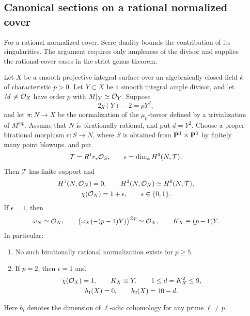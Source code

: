 \subsection{Canonical sections on a rational normalized cover}
\label{subsec:rational-canonical-equality}

For a rational normalized cover, Serre duality bounds the contribution
of its singularities. The argument requires only ampleness of the divisor
and supplies the rational-cover cases in the strict genus theorem.

\begin{proposition}\label{prop:rational-normalization-canonical}
Let $X$ be a smooth projective integral surface over an algebraically
closed field $k$ of characteristic $p>0$. Let $Y\subset X$ be a
smooth integral ample divisor, and let $M\ne\mathcal O_X$ have order $p$
with $M|_Y\simeq\mathcal O_Y$. Suppose
\[
 2g(Y)-2=pY^2,
\]
and let $\pi:N\to X$ be the normalization of the $\mu_p$-torsor
defined by a trivialization of $M^{\otimes p}$.
Assume that $N$ is birationally rational, and put $d=Y^2$.
Choose a proper birational morphism $r:S\to N$, where $S$ is
obtained from $\mathbf P^1\times\mathbf P^1$ by finitely many point blowups,
and put
\[
 \mathcal T=R^1r_*\mathcal O_S,\qquad
 \epsilon=\dim_k H^0(N,\mathcal T).
\]
Then $\mathcal T$ has finite support and
\begin{equation}\label{eq:rational-normalization-canonical-cohomology}
 \begin{gathered}
 H^1(N,\mathcal O_N)=0,\qquad
 H^2(N,\mathcal O_N)\simeq H^0(N,\mathcal T),\\
 \chi(\mathcal O_N)=1+\epsilon,\qquad
 \epsilon\in\{0,1\}.
 \end{gathered}
\end{equation}
If $\epsilon=1$, then
\[
 \omega_N\simeq\mathcal O_N,\qquad
 \bigl(\omega_X(-(p-1)Y)\bigr)^{\otimes p}\simeq\mathcal O_X,\qquad
 K_X\equiv(p-1)Y.
\]
In particular:
\begin{enumerate}[label=\textup{(\roman*)}]
\item No such birationally rational normalization exists for $p\geq5$.
\item If $p=2$, then $\epsilon=1$ and
\[
 \begin{gathered}
 \chi(\mathcal O_X)=1,\qquad K_X\equiv Y,\qquad
 1\leq d=K_X^2\leq9,\\
 b_1(X)=0,\qquad b_2(X)=10-d.
 \end{gathered}
\]
\end{enumerate}
Here $b_i$ denotes the dimension of $\ell$-adic cohomology for any
prime $\ell\ne p$.
\end{proposition}

